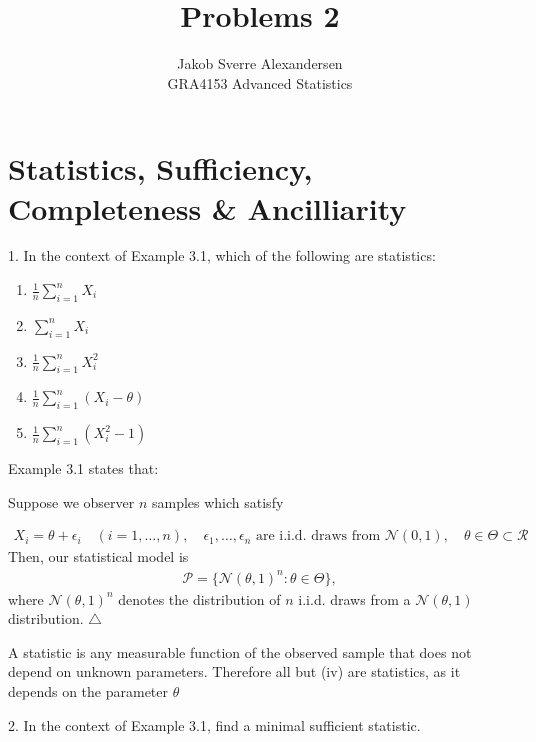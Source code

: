 \documentclass[10pt]{article}
\begin{document}
 
\title{Problems 2}
\author{Jakob Sverre Alexandersen\\
GRA4153 Advanced Statistics}
\maketitle

\tableofcontents
\newpage

\section{Statistics, Sufficiency, Completeness \& Ancilliarity}

1. In the context of Example 3.1, which of the following are statistics: 

\begin{enumerate}[label=(\roman*)]
    \item $\frac{1}{n} \sum_{i = 1}^{n} X_i $
    \item $\sum_{i = 1}^{n} X_i $
    \item $\frac{1}{n} \sum_{i = 1}^{n} X_i^2 $
    \item $\frac{1}{n} \sum_{i = 1}^{n} (X_i - \theta) $
    \item $\frac{1}{n} \sum_{i = 1}^{n} (X_i^2 - 1) $
\end{enumerate}

Example 3.1 states that: 

Suppose we observer $n $ samples which satisfy 

\begin{gather*}
    X_i = \theta + \epsilon_i\quad(i = 1, …, n),\quad\epsilon_1, …, \epsilon_n\text{ are i.i.d. draws from } \mathcal{N}(0, 1),\quad\theta\in\Theta\subset \mathcal{R}
\end{gather*}
Then, our statistical model is 
\begin{gather*}
    \mathcal{P} = \{\mathcal{N}(\theta, 1)^n : \theta\in\Theta\},
\end{gather*}
where $\mathcal{N}(\theta, 1)^n $ denotes the distribution of $n $ i.i.d. draws from a $\mathcal{N}(\theta, 1)$ distribution. $\triangle $

A statistic is any measurable function of the observed sample that does not depend on unknown parameters. Therefore all but (iv) are statistics, as it depends on the parameter $\theta $

\hfill

2. In the context of Example 3.1, find a minimal sufficient statistic. 
\end{document}
